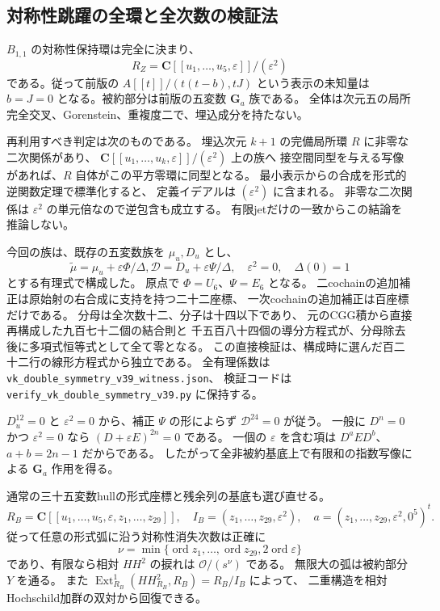 \subsection{対称性跳躍の全環と全次数の検証法}

$B_{1,1}$ の対称性保持環は完全に決まり、
\[
 R_Z=\mathbf C[[u_1,\ldots,u_5,\varepsilon]]/(\varepsilon^2)
\]
である。従って前版の $A[[t]]/(t(t-b),tJ)$ という表示の未知量は
$b=J=0$ となる。被約部分は前版の五変数 $\mathbf G_a$ 族である。
全体は次元五の局所完全交叉、Gorenstein、重複度二で、埋込成分を持たない。

再利用すべき判定は次のものである。
埋込次元 $k+1$ の完備局所環 $R$ に非零な二次関係があり、
$\mathbf C[[u_1,\ldots,u_k,\varepsilon]]/(\varepsilon^2)$ 上の族へ
接空間同型を与える写像があれば、$R$ 自体がこの平方零環に同型となる。
最小表示からの合成を形式的逆関数定理で標準化すると、
定義イデアルは $(\varepsilon^2)$ に含まれる。
非零な二次関係は $\varepsilon^2$ の単元倍なので逆包含も成立する。
有限jetだけの一致からこの結論を推論しない。

今回の族は、既存の五変数族を $\mu_u,D_u$ とし、
\[
 \widetilde\mu=\mu_u+\varepsilon\Phi/\Delta,
 \mathcal D=D_u+\varepsilon\Psi/\Delta,
 \quad\varepsilon^2=0,\quad\Delta(0)=1
\]
とする有理式で構成した。
原点で $\Phi=U_6$、$\Psi=E_6$ となる。
二cochainの追加補正は原始射の右合成に支持を持つ二十二座標、
一次cochainの追加補正は百座標だけである。
分母は全次数十二、分子は十四以下であり、
元のCGG積から直接再構成した九百七十二個の結合則と
千五百八十四個の導分方程式が、分母除去後に多項式恒等式として全て零となる。
この直接検証は、構成時に選んだ百二十二行の線形方程式から独立である。
全有理係数は \texttt{vk\_double\_symmetry\_v39\_witness.json}、
検証コードは \texttt{verify\_vk\_double\_symmetry\_v39.py} に保持する。

$D_u^{12}=0$ と $\varepsilon^2=0$ から、補正 $\Psi$ の形によらず
$\mathcal D^{24}=0$ が従う。
一般に $D^n=0$ かつ $\varepsilon^2=0$ なら
$(D+\varepsilon E)^{2n}=0$ である。
一個の $\varepsilon$ を含む項は $D^aED^b$、$a+b=2n-1$ だからである。
したがって全非被約基底上で有限和の指数写像による $\mathbf G_a$ 作用を得る。

通常の三十五変数hullの形式座標と残余列の基底も選び直せる。
\[
 R_B=\mathbf C[[u_1,\ldots,u_5,\varepsilon,z_1,\ldots,z_{29}]],
 \quad I_B=(z_1,\ldots,z_{29},\varepsilon^2),
 \quad a=(z_1,\ldots,z_{29},\varepsilon^2,0^5)^t.
\]
従って任意の形式弧に沿う対称性消失次数は正確に
\[
 \nu=\min\{\operatorname{ord}z_1,\ldots,
                  \operatorname{ord}z_{29},2\operatorname{ord}\varepsilon\}
\]
であり、有限なら相対 $HH^2$ の捩れは $\mathcal O/(s^\nu)$ である。
無限大の弧は被約部分 $Y$ を通る。
また $\operatorname{Ext}_{R_B}^1(HH^2_{R_B},R_B)=R_B/I_B$ によって、
二重構造を相対Hochschild加群の双対から回復できる。

